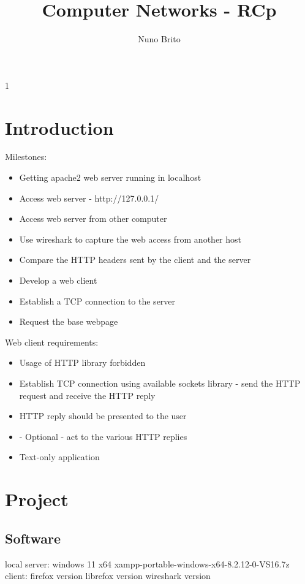 \documentclass[11pt]{report}
\title{Computer Networks - RCp}
\author{Nuno Brito}
\begin{document}
    {{{1

\tableofcontents

\section{Introduction}
    Milestones:
    \begin{itemize}
        \item Getting apache2 web server running in localhost
        \item Access web server - http://127.0.0.1/
        \item Access web server from other computer
        \item Use wireshark to capture the web access from another host
        \item Compare the HTTP headers sent by the client and the server
        \item Develop a web client
        \item Establish a TCP connection to the server
        \item Request the base webpage
    \end{itemize}
    
    Web client requirements:
    \begin{itemize}
        \item Usage of HTTP library forbidden
        \item Establish TCP connection using available sockets library - send the HTTP request and receive the HTTP reply
        \item HTTP reply should be presented to the user
        \item - Optional - act to the various HTTP replies
        \item Text-only application
    \end{itemize}

\section{Project}
    \subsection{Software}
        local server:
            windows 11 x64
            xampp-portable-windows-x64-8.2.12-0-VS16.7z
        client:
            firefox version
            librefox version
            wireshark version
    
}}}
\end{document}
